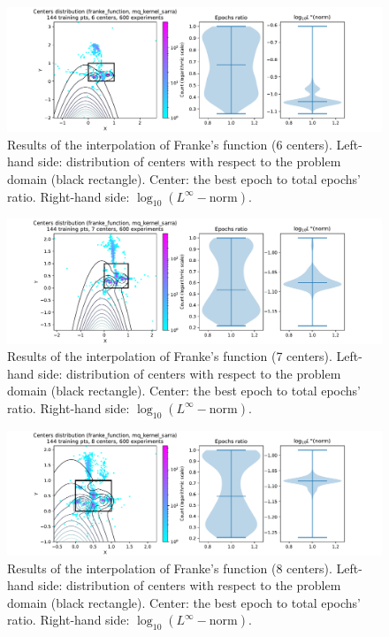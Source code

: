 \documentclass[12pt]{report} %
\begin{document}
\begin{figure}[H]
  \includegraphics[width=\textwidth, trim={2cm 0 2.8cm 0}, clip=true]{imagenes/experiments/2d/franke_interpolation/tr12_c6_franke_function_mq_kernel_sarra.pdf}
  \caption{Results of the interpolation of Franke's function (6 centers).
    Left-hand side: distribution of centers with respect to the problem domain (black rectangle). Center: the best epoch to total epochs' ratio.
    Right-hand side: $\log_{10}(L^\infty-\text{norm})$.}
  \label{fig:franke-tr12-c6-mq}
\end{figure}
\begin{figure}[H]
  \includegraphics[width=\textwidth, trim={2cm 0 2.8cm 0}, clip=true]{imagenes/experiments/2d/franke_interpolation/tr12_c7_franke_function_mq_kernel_sarra.pdf}
  \caption{Results of the interpolation of Franke's function (7 centers).
    Left-hand side: distribution of centers with respect to the problem domain (black rectangle). Center: the best epoch to total epochs' ratio.
    Right-hand side: $\log_{10}(L^\infty-\text{norm})$.}
  \label{fig:franke-tr12-c7-mq}
\end{figure}
\begin{figure}[H]
  \includegraphics[width=\textwidth, trim={2cm 0 2.8cm 0}, clip=true]{imagenes/experiments/2d/franke_interpolation/tr12_c8_franke_function_mq_kernel_sarra.pdf}
  \caption{Results of the interpolation of Franke's function (8 centers).
    Left-hand side: distribution of centers with respect to the problem domain (black rectangle). Center: the best epoch to total epochs' ratio.
    Right-hand side: $\log_{10}(L^\infty-\text{norm})$.}
  \label{fig:franke-tr12-c8-mq}
\end{figure}
\end{document}
